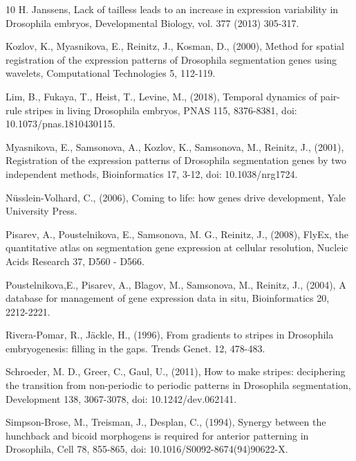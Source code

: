 \documentclass[final,authoryear, 5p, times]{elsarticle}
\begin{document}
\begin{thebibliography}{10}
 H. Janssens, Lack of tailless leads to an increase in expression variability in Drosophila embryos, Developmental Biology, vol. 377 (2013) 305-317.

   Kozlov, K.,  Myasnikova, E., Reinitz, J., Kosman, D., (2000),   Method for spatial registration of the expression patterns of Drosophila segmentation genes using wavelets, Computational Technologies 5, 112-119.

   Lim, B.,   Fukaya, T.,  Heist, T.,   Levine, M., (2018),  Temporal dynamics of pair-rule stripes in living Drosophila embryos, PNAS 115, 8376-8381, doi: 10.1073/pnas.1810430115.

 Myasnikova, E.,   Samsonova, A.,  Kozlov, K.,  Samsonova, M.,   Reinitz, J., (2001),  Registration of the expression patterns of Drosophila segmentation genes by two independent methods, Bioinformatics 17,  3-12,   doi: 10.1038/nrg1724.

 N\"usslein-Volhard, C.,  (2006), Coming to life: how genes drive development, Yale University Press.

   Pisarev, A.,  Poustelnikova, E.,  Samsonova, M. G.,    Reinitz, J., (2008),  FlyEx, the quantitative atlas on segmentation gene expression at cellular resolution, Nucleic Acids Research 37, D560 - D566.

  Poustelnikova,E.,   Pisarev, A.,   Blagov, M.,   Samsonova, M.,    Reinitz, J., (2004),  A database for management of gene expression data in situ, Bioinformatics 20, 2212-2221.

  Rivera-Pomar, R.,  J\"ackle, H., (1996), From gradients to stripes in Drosophila embryogenesis: filling in the gaps. Trends Genet. 12, 478-483.

  Schroeder, M. D.,   Greer, C.,  Gaul, U., (2011),  How to make stripes: deciphering the transition from non-periodic to periodic patterns in Drosophila segmentation, Development 138, 3067-3078, doi: 10.1242/dev.062141.

   Simpson-Brose, M.,  Treisman, J.,   Desplan, C., (1994),  Synergy between the hunchback and bicoid morphogens is required for anterior patterning in Drosophila, Cell 78, 855-865, doi: 10.1016/S0092-8674(94)90622-X.


\end{thebibliography}
\end{document}

